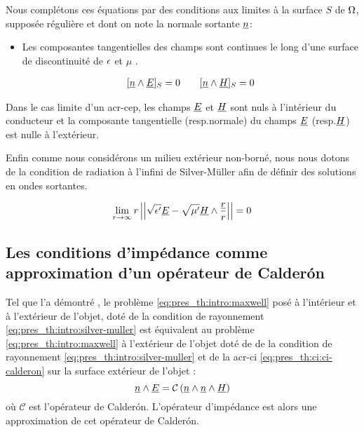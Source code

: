 Nous complétons ces équations par des conditions aux limites à la surface $S$ de $\Omega$, supposée régulière et dont on note la normale sortante $\underline{n}$:
\begin{itemize}
  \item Les composantes tangentielles des champs sont continues le long d'une surface de discontinuité de $\epsilon$ et $\mu$ \cite[(2.10) p.~8]{senior_approximate_1995}.

  \begin{align}
  \label{eq:pres_th:intro:transmissions}[\underline{n} \wedge \underline{E}]_S = 0  \qquad [\underline{n} \wedge \underline{H}]_S = 0
  \end{align}
\end{itemize}
Dans le cas limite d'un \gls{acr-cep}, les champs $\underline{E}$ et $\underline{H}$ sont nuls à l'intérieur du conducteur et la composante tangentielle (resp.normale) du champs $\underline{E}$ (resp.$\underline{H}$) est nulle à l'extérieur.


Enfin comme nous considérons un milieu extérieur non-borné, nous nous dotons de la condition de radiation à l'infini de Silver-Müller afin de définir des solutions en ondes sortantes.


\begin{equation}
\label{eq:pres_th:intro:silver-muller}
\lim_{r\rightarrow\infty}r\left|\left|\sqrt{\epsilon'}\underline{E} - \sqrt{\mu'}\underline{H}\wedge\dfrac{\underline{r}}{r}\right|\right| = 0
\end{equation} 

\subsection*{Les conditions d'impédance comme approximation d'un opérateur de Calderón}

Tel que l'a démontré \cite[Theorem 1., p.~1042]{lafitte_diffraction_1998}, le problème \eqref{eq:pres_th:intro:maxwell}  posé à l'intérieur et à l'extérieur de l'objet, doté de la condition de rayonnement \eqref{eq:pres_th:intro:silver-muller} est équivalent au problème \eqref{eq:pres_th:intro:maxwell} à l'extérieur de l'objet doté de de la condition de rayonnement \eqref{eq:pres_th:intro:silver-muller} et de la \gls{acr-ci} \eqref{eq:pres_th:ci:ci-calderon} sur la surface extérieur de l'objet : 
\begin{equation}
\label{eq:pres_th:ci:ci-calderon}
\underline{n} \wedge \underline{E} = \mathcal{C}\left(\underline{n} \wedge \underline{n} \wedge \underline{H}\right)
\end{equation}
où $ \mathcal{C}$ est l'opérateur de Calderón.
L'opérateur d'impédance est alors une approximation de cet opérateur de Calderón.

